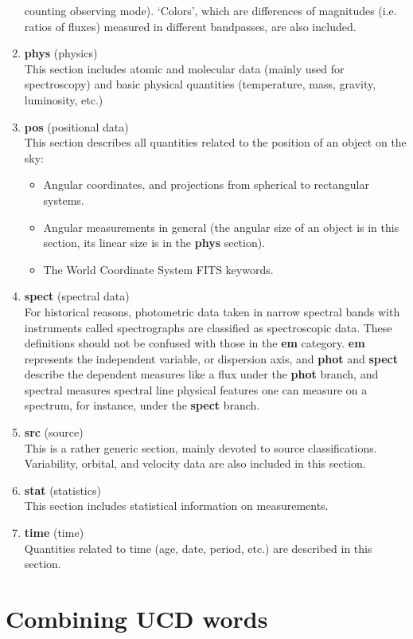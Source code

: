 \documentclass[11pt,a4paper]{ivoa}
\begin{document}
\begin{enumerate}
counting observing mode). `Colors', which are differences of magnitudes (i.e. ratios of fluxes) 
measured in different bandpasses, are also included.
\item {\bf phys} (physics)\\ This section includes atomic and molecular data (mainly used for 
spectroscopy) and basic physical quantities (temperature, mass, gravity, luminosity, etc.)
\item {\bf pos} (positional data)\\ This section describes all quantities related to the position of 
an object on the sky:
\begin{itemize}
\item Angular coordinates, and projections from spherical to rectangular systems.
\item Angular measurements in general (the angular size of an object is in this section, its linear 
size is in the {\bf phys} section).
\item The World Coordinate System FITS keywords.
\end{itemize}
\item {\bf spect} (spectral data)\\ For historical reasons, photometric data taken in narrow spectral 
bands with instruments called spectrographs are classified as spectroscopic data. These definitions 
should not be confused with those in the {\bf em} category. {\bf em} represents the independent 
variable, or dispersion axis, and {\bf phot} and {\bf spect} describe the dependent measures like a 
flux under the {\bf phot} branch, and spectral measures spectral line physical features one can 
measure on a spectrum, for instance, under the {\bf spect} branch. 
\item {\bf src} (source)\\ This is a rather generic section, mainly devoted to source classifications.
Variability, orbital, and velocity data are also included in this section.
\item {\bf stat} (statistics)\\ This section includes statistical information on measurements.
\item {\bf time} (time)\\ Quantities related to time (age, date, period, etc.) are described in this 
section.
\end{enumerate}

\section{Combining UCD words}
\end{document}
